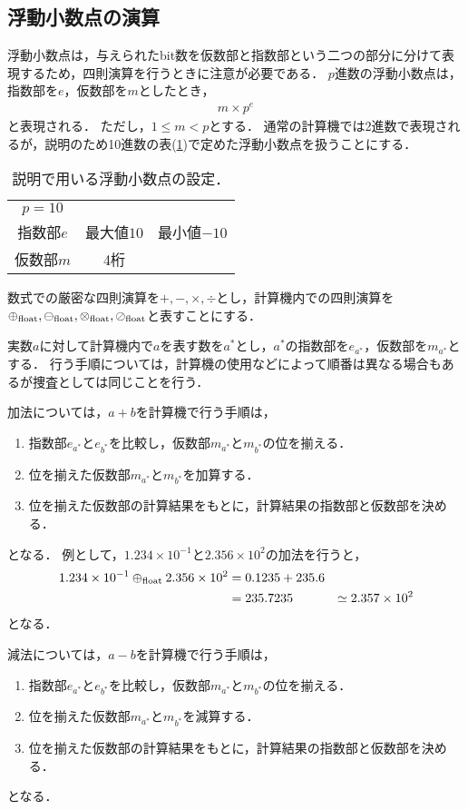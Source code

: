 \subsection{浮動小数点の演算}
浮動小数点は，与えられたbit数を仮数部と指数部という二つの部分に分けて表現するため，四則演算を行うときに注意が必要である．
$p$進数の浮動小数点は，指数部を$e$，仮数部を$m$としたとき，
\begin{align*}
    m \times p^e
\end{align*}
と表現される．
ただし，$1 \leq m < p$とする．
通常の計算機では2進数で表現されるが，説明のため10進数の表(\ref{tab:float_setting})で定めた浮動小数点を扱うことにする．
\begin{table}[H]
    \centering
    \caption{説明で用いる浮動小数点の設定．}
    \begin{tabular}{ccc}
        \hline
        $p=10$ & & \\
        指数部$e$ & 最大値$10$ & 最小値$-10$ \\
        仮数部$m$ & 4桁 &
    \end{tabular}
    \label{tab:float_setting}
\end{table}

数式での厳密な四則演算を$+,-,\times,\div$とし，計算機内での四則演算を$\oplus_{\mathrm{float}},\ominus_{\mathrm{float}},\otimes_{\mathrm{float}},\oslash_{\mathrm{float}}$と表すことにする．

実数$a$に対して計算機内で$a$を表す数を$a^{\ast}$とし，$a^{\ast}$の指数部を$e_{a^{\ast}}$，仮数部を$m_{a^{\ast}}$とする．
行う手順については，計算機の使用などによって順番は異なる場合もあるが捜査としては同じことを行う．


加法については，$a + b$を計算機で行う手順は，
\begin{enumerate}
    \item 指数部$e_{a^{\ast}}$と$e_{b^{\ast}}$を比較し，仮数部$m_{a^{\ast}}$と$m_{b^{\ast}}$の位を揃える．
    \item 位を揃えた仮数部$m_{a^{\ast}}$と$m_{b^{\ast}}$を加算する．
    \item 位を揃えた仮数部の計算結果をもとに，計算結果の指数部と仮数部を決める．
\end{enumerate}
となる．
例として，$1.234 \times 10^{-1}$と$2.356 \times 10^{2}$の加法を行うと，
\begin{align*}
    1.234 \times 10^{-1} \oplus_{\mathrm{float}} 2.356 \times 10^{2} &= 0.1235 + 235.6 \\
    &= 235.7235 
    &\simeq 2.357 \times 10^{2}
\end{align*}
となる．

減法については，$a - b$を計算機で行う手順は，
\begin{enumerate}
    \item 指数部$e_{a^{\ast}}$と$e_{b^{\ast}}$を比較し，仮数部$m_{a^{\ast}}$と$m_{b^{\ast}}$の位を揃える．
    \item 位を揃えた仮数部$m_{a^{\ast}}$と$m_{b^{\ast}}$を減算する．
    \item 位を揃えた仮数部の計算結果をもとに，計算結果の指数部と仮数部を決める．
\end{enumerate}
となる．

